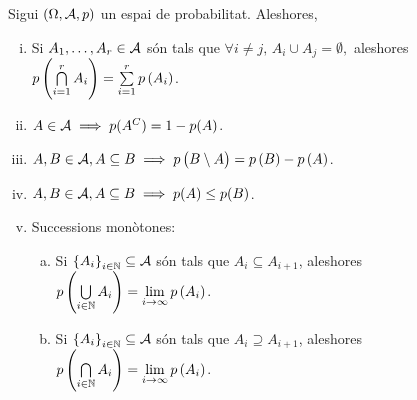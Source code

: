 \begin{prop}
    Sigui $(\Omega,\mathcal{A}, p)$ un espai de probabilitat. Aleshores,
    \begin{enumerate}[i)]
        \item Si $A_1, \dots, A_r \in \mathcal{A}$ són tals que $\forall i\neq j,\, A_i \cup A_j = \emptyset,$ aleshores 
	  $p\left( \bigcap\limits_{i=1}^{r} A_i \right)= \sum\limits_{i=1}^{r} p\left( A_i \right)$.
        \item \label{item:esp_prob_2}$A \in \mathcal{A} \implies p(A^C)=1-p(A)$.
        \item \label{item:esp_prob_3}$A,B \in \mathcal{A}, A \subseteq B \implies p\left( B\setminus A \right) = p\left( B\right) - p\left( A\right)$.
        \item $A,B \in \mathcal{A}, A \subseteq B \implies p(A) \le p(B)$.
        \item \label{item:esp_prob_5}Successions monòtones:
        \begin{enumerate}[a)]
         \item Si $\left\{A_i\right\}_{i\in\mathbb{N}} \subseteq \mathcal{A}$ són tals que $A_i\subseteq A_{i+1}$, aleshores $p\left( \bigcup\limits_{i\in\mathbb{N}} A_i\right) = \lim\limits_{i\to\infty} p\left( A_i\right)$.
         \item Si $\left\{A_i\right\}_{i\in\mathbb{N}} \subseteq \mathcal{A}$ són tals que $A_i\supseteq A_{i+1}$, aleshores $p\left( \bigcap\limits_{i\in\mathbb{N}} A_i\right) = \lim\limits_{i\to\infty} p\left( A_i\right)$.
        \end{enumerate}
    \end{enumerate}
\end{prop}
